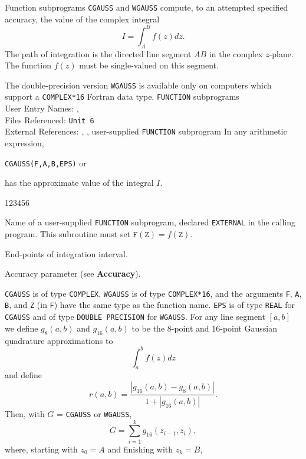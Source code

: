                     
             
          
                  
Function subprograms {\tt CGAUSS} and {\tt WGAUSS} compute,
to an attempted specified accuracy, the value of the complex integral
 $$ I=\int^B_A f(z)dz.$$
The path of integration is the directed line segment $AB$ in the complex
$z$-plane. The function $f(z)$ must be single-valued on this segment.
\par
The double-precision version {\tt WGAUSS} is available only on computers
which support a {\tt COMPLEX*16} Fortran data type.
\Structure
{\tt FUNCTION} subprograms  \\
User Entry Names: , \\
Files Referenced: {\tt Unit 6} \\
External References: , ,
user-supplied {\tt FUNCTION} subprogram
\Usage
In any arithmetic expression,
\begin{center}
{\tt CGAUSS(F,A,B,EPS)} \qquad or 
\end{center}
has the approximate value of the integral $I$.
\begin{DLtt}{123456}
\item[F] Name of a user-supplied {\tt FUNCTION} subprogram, declared
{\tt EXTERNAL} in the calling program. This subroutine must set
$\mathtt{F(Z)} = f(\mathtt{Z})$.
\item [A,B]End-points of integration interval.
\item[EPS]Accuracy parameter (see {\bf Accuracy}).
\end{DLtt}
{\tt CGAUSS} is of type {\tt COMPLEX}, {\tt WGAUSS} is of type
{\tt COMPLEX*16}, and the arguments {\tt F}, {\tt A},
{\tt B}, and {\tt Z} (in {\tt F}) have the same type as the
function name. {\tt EPS} is of type {\tt REAL} for {\tt CGAUSS}
and of type {\tt DOUBLE PRECISION} for {\tt WGAUSS}.
\Method
For any line segment $[a,b]$ we define $g_8(a,b)$ and $g_{16}(a,b)$ to
be the 8-point and 16-point Gaussian quadrature approximations to
     $$\int^b_a f(z)dz $$
and define
$$ r(a,b) =\frac{|g_{16} (a,b) - g_8(a,b)|}{1+|g_{16}(a,b)|}. $$
\newpage
Then, with $G$ = {\tt CGAUSS} or {\tt WGAUSS},
$$ G =\sum_{i=1}^kg_{16}(z_{i-1},z_i),$$
where, starting with $ z_0=A $ and finishing with $z_k=B$,
